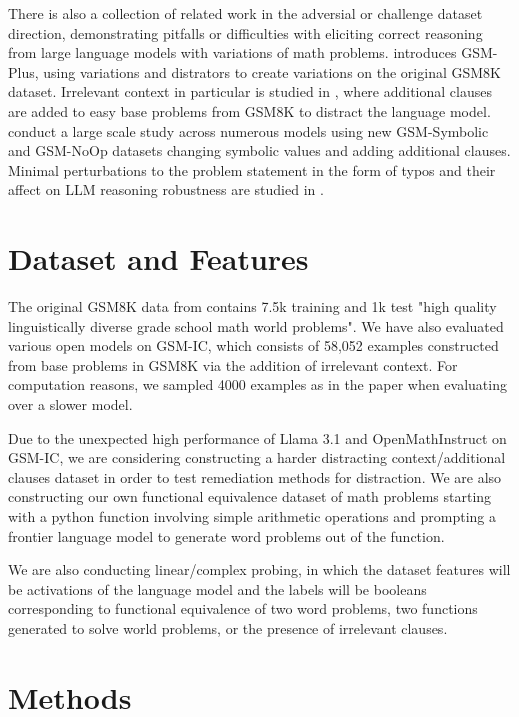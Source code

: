 \documentclass{article}
\begin{document}
There is also a collection of related work in the adversial or challenge dataset direction, demonstrating pitfalls or difficulties with eliciting correct reasoning from large language models with variations of math problems. \citep{li} introduces GSM-Plus, using variations and distrators to create variations on the original GSM8K dataset. Irrelevant context in particular is studied in \citep{shi}, where additional clauses are added to easy base problems from GSM8K to distract the language model. \citep{mirzadeh} conduct a large scale study across numerous models using new GSM-Symbolic and GSM-NoOp datasets changing symbolic values and adding additional clauses. Minimal perturbations to the problem statement in the form of typos and their affect on LLM reasoning robustness are studied in \citep{gan}.

\section{Dataset and Features}

The original GSM8K data from \citep{cobbe} contains 7.5k training and 1k test "high quality linguistically diverse grade school math world problems". We have also evaluated various open models on GSM-IC, which consists of 58,052 examples constructed from base problems in GSM8K via the addition of irrelevant context. For computation reasons, we sampled 4000 examples as in the paper \citep{shi} when evaluating over a slower model.

Due to the unexpected high performance of Llama 3.1 and OpenMathInstruct on GSM-IC, we are considering constructing a harder distracting context/additional clauses dataset in order to test remediation methods for distraction. We are also constructing our own functional equivalence dataset of math problems starting with a python function involving simple arithmetic operations and prompting a frontier language model to generate word problems out of the function.

We are also conducting linear/complex probing, in which the dataset features will be activations of the language model and the labels will be booleans corresponding to functional equivalence of two word problems, two functions generated to solve world problems, or the presence of irrelevant clauses.

\section{Methods}
\end{document}
